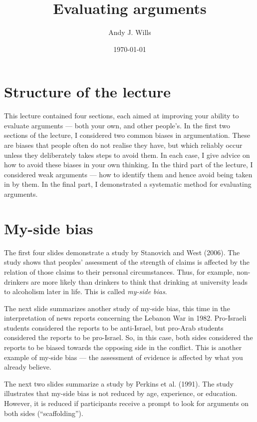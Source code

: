\documentclass[12pt]{article}
\begin{document}
	\title{Evaluating arguments}
	\date{\today}
	\author{Andy J. Wills}
	\maketitle

\section{Structure of the lecture}

This lecture contained four sections, each aimed at improving your
ability to evaluate arguments --- both your own, and other
people's. In the first two sections of the lecture, I considered two
common biases in argumentation. These are biases that people often do
not realise they have, but which reliably occur unless they
deliberately takes steps to avoid them. In each case, I give advice on
how to avoid these biases in your own thinking. In the third part of
the lecture, I considered weak arguments --- how to identify them and
hence avoid being taken in by them. In the final part, I demonstrated
a systematic method for evaluating arguments.

\section{My-side bias}

The first four slides demonstrate a study by Stanovich and West
(2006). The study shows that peoples' assessment of the strength of
claims is affected by the relation of those claims to their personal
circumstances. Thus, for example, non-drinkers are more likely than
drinkers to think that drinking at university leads to alcoholism
later in life. This is called \emph{my-side bias}.

The next slide summarizes another study of my-side bias, this time in
the interpretation of news reports concerning the Lebanon War in
1982. Pro-Israeli students considered the reports to be anti-Israel,
but pro-Arab students considered the reports to be pro-Israel. So, in
this case, both sides considered the reports to be biased towards the
opposing side in the conflict. This is another example of my-side bias
--- the assessment of evidence is affected by what you already
believe.

The next two slides summarize a study by Perkins et al. (1991). The
study illustrates that my-side bias is not reduced by age, experience,
or education. However, it is reduced if participants receive a prompt
to look for arguments on both sides (``scaffolding'').
\end{document}
